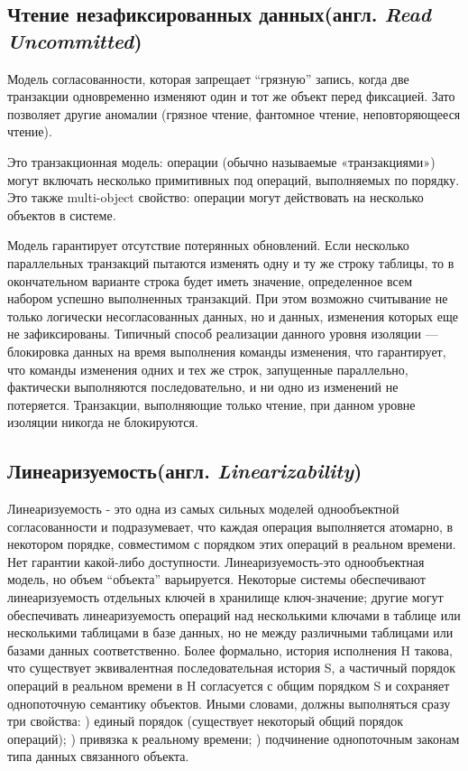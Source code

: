 \documentclass[12pt,  openany]{book}
\begin{document}
\subsection{Чтение незафиксированных данных(англ.  \textit{Read Uncommitted})}
Модель согласованности, которая запрещает “грязную” запись, когда две транзакции одновременно изменяют один и тот же объект перед фиксацией. Зато позволяет другие аномалии (грязное чтение, фантомное чтение, неповторяющееся чтение). 
\par
Это транзакционная модель: операции (обычно называемые «транзакциями») могут включать несколько примитивных под операций, выполняемых по порядку. Это также multi-object свойство: операции могут действовать на несколько объектов в системе.
\par
Модель гарантирует отсутствие потерянных обновлений. Если несколько параллельных транзакций пытаются изменять одну и ту же строку таблицы, то в окончательном варианте строка будет иметь значение, определенное всем набором успешно выполненных транзакций. При этом возможно считывание не только логически несогласованных данных, но и данных, изменения которых еще не зафиксированы.
Типичный способ реализации данного уровня изоляции — блокировка данных на время выполнения команды изменения, что гарантирует, что команды изменения одних и тех же строк, запущенные параллельно, фактически выполняются последовательно, и ни одно из изменений не потеряется. Транзакции, выполняющие только чтение, при данном уровне изоляции никогда не блокируются.

\subsection{Линеаризуемость(англ.  \textit{Linearizability})}
Линеаризуемость - это одна из самых сильных моделей однообъектной согласованности и подразумевает, что каждая операция выполняется атомарно, в некотором порядке, совместимом с порядком этих операций в реальном времени. 
Нет гарантии какой-либо доступности.
Линеаризуемость-это однообъектная модель, но объем “объекта” варьируется. Некоторые системы обеспечивают линеаризуемость отдельных ключей в хранилище ключ-значение; другие могут обеспечивать линеаризуемость операций над несколькими ключами в таблице или несколькими таблицами в базе данных, но не между различными таблицами или базами данных соответственно.
Более формально, история исполнения H такова, что существует эквивалентная последовательная история S, а частичный порядок операций в реальном времени в H согласуется с общим порядком S и сохраняет однопоточную семантику объектов.
Иными словами, должны выполняться сразу три свойства: ) единый порядок (существует некоторый общий порядок операций); ) привязка к реальному времени; ) подчинение однопоточным законам типа данных связанного объекта.
\end{document}
